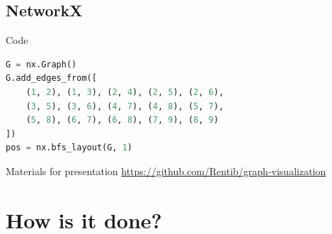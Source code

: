 \documentclass[11pt]{beamer}
\begin{document}
\subsection{NetworkX}
\begin{frame}{\subsecname}
\begin{figure}
\resizebox{0.8\textwidth}{!}{}
\end{figure}
\end{frame}

\begin{frame}[fragile]{\subsecname}{Code}
    \begin{block}{}
        \begin{lstlisting}[language=python]
G = nx.Graph()
G.add_edges_from([
    (1, 2), (1, 3), (2, 4), (2, 5), (2, 6),
    (3, 5), (3, 6), (4, 7), (4, 8), (5, 7),
    (5, 8), (6, 7), (6, 8), (7, 9), (8, 9)
])
pos = nx.bfs_layout(G, 1)
        \end{lstlisting}
    \end{block}

    \pause
    \begin{block}{Materials for presentation}
        \url{https://github.com/Rentib/graph-visualization}
    \end{block}
\end{frame}

\section{How is it done?}
\begin{frame}{\secname}
    \tableofcontents[currentsection,hideothersubsections,sectionstyle=hide]
\end{frame}
\end{document}
